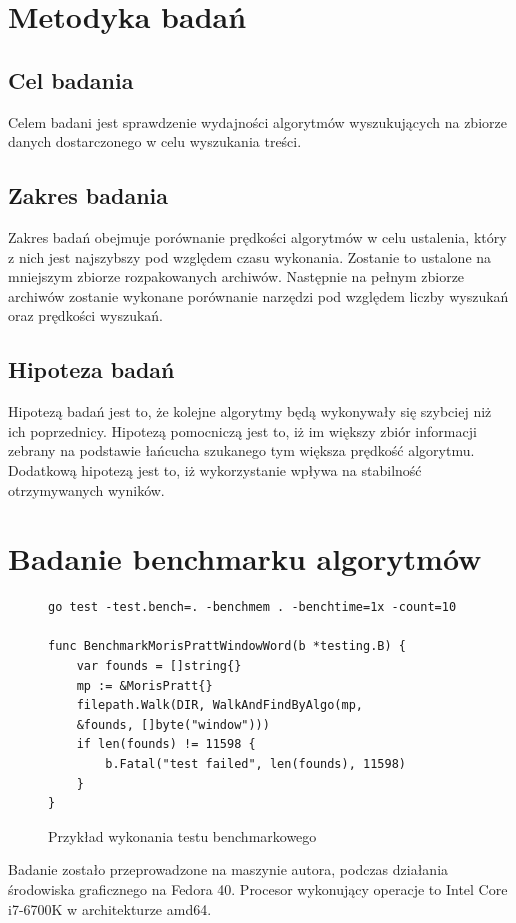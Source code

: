 \section{Metodyka badań}

\subsection{Cel badania}

Celem badani jest sprawdzenie wydajności algorytmów wyszukujących na zbiorze
danych dostarczonego w celu wyszukania treści.

\subsection{Zakres badania}

Zakres badań obejmuje porównanie prędkości algorytmów w celu ustalenia, który
z nich jest najszybszy pod względem czasu wykonania. Zostanie to ustalone na
mniejszym zbiorze rozpakowanych archiwów. Następnie na pełnym zbiorze archiwów
zostanie wykonane porównanie narzędzi pod względem liczby wyszukań oraz prędkości
wyszukań.

\subsection{Hipoteza badań}

Hipotezą badań jest to, że kolejne algorytmy będą wykonywały się szybciej niż ich
poprzednicy. Hipotezą pomocniczą jest to, iż im większy zbiór informacji zebrany
na podstawie łańcucha szukanego tym większa prędkość algorytmu. Dodatkową hipotezą jest
to, iż wykorzystanie  wpływa na stabilność 
otrzymywanych wyników.

\section{Badanie benchmarku algorytmów}

\begin{figure}[h]
  \centering
  \begin{lstlisting}
go test -test.bench=. -benchmem . -benchtime=1x -count=10

func BenchmarkMorisPrattWindowWord(b *testing.B) {
	var founds = []string{}
	mp := &MorisPratt{}
	filepath.Walk(DIR, WalkAndFindByAlgo(mp,
    &founds, []byte("window")))
	if len(founds) != 11598 {
		b.Fatal("test failed", len(founds), 11598)
	}
}
  \end{lstlisting}
  \caption{Przykład wykonania testu benchmarkowego}
  \label{fig:code:examplePerfTest}
\end{figure}
Badanie zostało przeprowadzone na maszynie autora, podczas działania środowiska
graficznego na Fedora 40. Procesor wykonujący operacje to Intel Core i7-6700K
w architekturze amd64.

